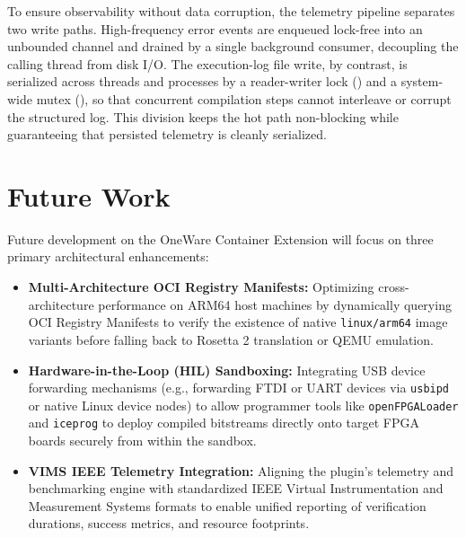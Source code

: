 To ensure observability without data corruption, the telemetry pipeline separates two write paths. High-frequency error events are enqueued lock-free into an unbounded channel and drained by a single background consumer, decoupling the calling thread from disk I/O. The execution-log file write, by contrast, is serialized across threads and processes by a reader-writer lock () and a system-wide mutex (), so that concurrent compilation steps cannot interleave or corrupt the structured log. This division keeps the hot path non-blocking while guaranteeing that persisted telemetry is cleanly serialized.

\section{Future Work}
Future development on the OneWare Container Extension will focus on three primary architectural enhancements:
\begin{itemize}
    \item \textbf{Multi-Architecture OCI Registry Manifests:} Optimizing cross-architecture performance on ARM64 host machines by dynamically querying OCI Registry Manifests to verify the existence of native \texttt{linux/arm64} image variants before falling back to Rosetta 2 translation or QEMU emulation.
    \item \textbf{Hardware-in-the-Loop (HIL) Sandboxing:} Integrating USB device forwarding mechanisms (e.g., forwarding FTDI or UART devices via \texttt{usbipd} or native Linux device nodes) to allow programmer tools like \texttt{openFPGALoader} and \texttt{iceprog} to deploy compiled bitstreams directly onto target FPGA boards securely from within the sandbox.
    \item \textbf{VIMS IEEE Telemetry Integration:} Aligning the plugin's telemetry and benchmarking engine with standardized IEEE Virtual Instrumentation and Measurement Systems formats to enable unified reporting of verification durations, success metrics, and resource footprints.
\end{itemize}
